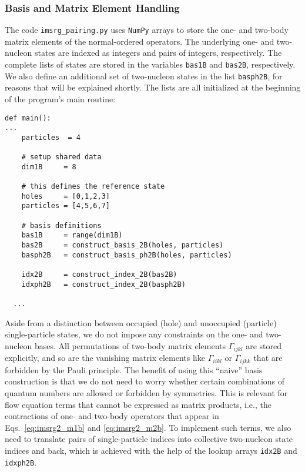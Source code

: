 {\subsubsection*{Basis and Matrix Element Handling}
The code \texttt{imsrg\_pairing.py} uses \texttt{NumPy} arrays to store
the one- and two-body matrix elements of the normal-ordered operators.
The underlying one- and two-nucleon states are indexed as integers and
pairs of integers, respectively. The complete lists of states are stored
in the variables \texttt{bas1B} and \texttt{bas2B}, respectively. We
also define an additional set of two-nucleon states in the list \texttt{basph2B},
for reasons that will be explained shortly. The lists are all initialized
at the beginning of the program's main routine:
\begin{lstlisting}
def main():
...
    particles  = 4

    # setup shared data
    dim1B     = 8

    # this defines the reference state
    holes     = [0,1,2,3]
    particles = [4,5,6,7]

    # basis definitions
    bas1B     = range(dim1B)
    bas2B     = construct_basis_2B(holes, particles)
    basph2B   = construct_basis_ph2B(holes, particles)

    idx2B     = construct_index_2B(bas2B)
    idxph2B   = construct_index_2B(basph2B)

  ...
\end{lstlisting}
Aside from a distinction between occupied (hole) and unoccupied (particle)
single-particle states, we do not impose any constraints on the one- and
two-nucleon bases. All permutations of two-body matrix elements $\Gamma_{ijkl}$
are stored explicitly, and so are the vanishing matrix elements like 
$\Gamma_{iikl}$ or $\Gamma_{ijkk}$ that are forbidden by the Pauli principle.
The benefit of using this ``naive'' basis construction is that we do not need
to worry whether certain combinations of quantum numbers are allowed or 
forbidden by symmetries. This is relevant for flow equation terms that cannot 
be expressed as matrix products, i.e., the contractions of one- and two-body 
operators that appear in Eqs.~\eqref{eq:imsrg2_m1b} and \eqref{eq:imsrg2_m2b}. 
To implement such terms, we also need to translate pairs of single-particle 
indices into collective two-nucleon state indices and back, which is achieved 
with the help of the lookup arrays \texttt{idx2B} and \texttt{idxph2B}.

}
